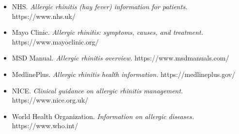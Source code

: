 \begin{itemize}
    \item NHS. \textit{Allergic rhinitis (hay fever) information for patients.} https://www.nhs.uk/
    \item Mayo Clinic. \textit{Allergic rhinitis: symptoms, causes, and treatment.} https://www.mayoclinic.org/
    \item MSD Manual. \textit{Allergic rhinitis overview.} https://www.msdmanuals.com/
    \item MedlinePlus. \textit{Allergic rhinitis health information.} https://medlineplus.gov/
    \item NICE. \textit{Clinical guidance on allergic rhinitis management.} https://www.nice.org.uk/
    \item World Health Organization. \textit{Information on allergic diseases.} https://www.who.int/
\end{itemize}
